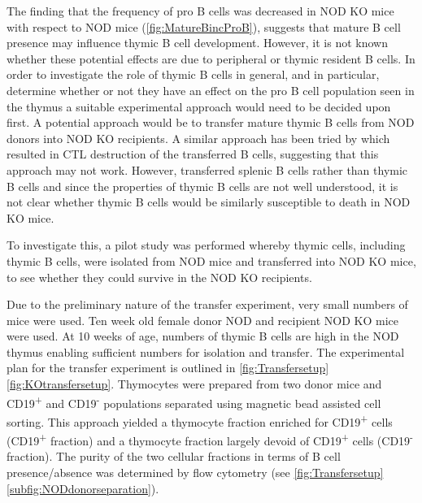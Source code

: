 The finding that the frequency of pro B cells was decreased in NOD KO mice with respect to NOD mice (\cref{fig:MatureBincProB}), suggests that mature B cell presence may influence thymic B cell development.
However, it is not known whether these potential effects are due to peripheral or thymic resident B cells.
In order to investigate the role of thymic B cells in general, and in particular, determine whether or not they have an effect on the pro B cell population seen in the thymus a suitable experimental approach would need to be decided upon first.
A potential approach would be to transfer mature thymic B cells from NOD donors into NOD KO recipients.
A similar approach has been tried by \citet{Serreze1998} which resulted in CTL destruction of the transferred B cells, suggesting that this approach may not work.
However, \citet{Serreze1998} transferred splenic B cells rather than thymic B cells and since the properties of thymic B cells are not well understood, it is not clear whether thymic B cells would be similarly susceptible to death in NOD KO mice.

To investigate this, a pilot study was performed whereby thymic cells, including thymic B cells, were isolated from NOD mice and transferred into NOD KO mice, to see whether they could survive in the NOD KO recipients.

Due to the preliminary nature of the transfer experiment, very small numbers of mice were used.
Ten week old female donor NOD and recipient NOD KO mice were used.
At 10 weeks of age, numbers of thymic B cells are high in the NOD thymus enabling sufficient numbers for isolation and transfer.
The experimental plan for the transfer experiment is outlined in \cref{fig:Transfersetup} \ref{fig:KOtransfersetup}.
Thymocytes were prepared from two donor mice and CD19\textsuperscript{+} and CD19\textsuperscript{-} populations separated using magnetic bead assisted cell sorting.
This approach yielded a thymocyte fraction enriched for CD19\textsuperscript{+} cells (CD19\textsuperscript{+} fraction) and a thymocyte fraction largely devoid of CD19\textsuperscript{+} cells (CD19\textsuperscript{-} fraction).
The purity of the two cellular fractions in terms of B cell presence/absence was determined by flow cytometry (see \cref{fig:Transfersetup} \ref{subfig:NODdonorseparation}).



